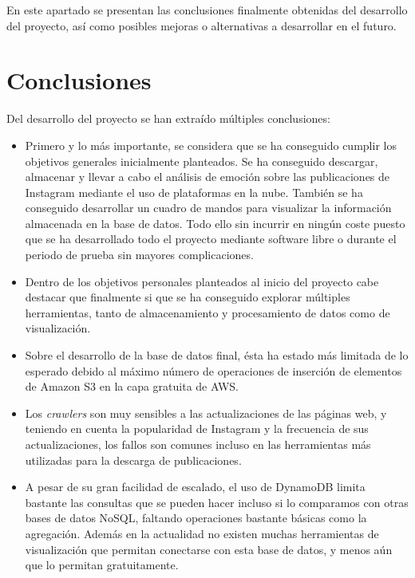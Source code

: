 
En este apartado se presentan las conclusiones finalmente obtenidas del desarrollo del proyecto, así como posibles mejoras o alternativas a desarrollar en el futuro.

\section{Conclusiones}

Del desarrollo del proyecto se han extraído múltiples conclusiones: 

\begin{itemize}
    \item Primero y lo más importante, se considera que se ha conseguido cumplir los objetivos generales inicialmente planteados. Se ha conseguido descargar, almacenar y llevar a cabo el análisis de emoción sobre las publicaciones de Instagram mediante el uso de plataformas en la nube. También se ha conseguido desarrollar un cuadro de mandos para visualizar la información almacenada en la base de datos. Todo ello sin incurrir en ningún coste puesto que se ha desarrollado todo el proyecto mediante software libre o durante el periodo de prueba sin mayores complicaciones.
    \item Dentro de los objetivos personales planteados al inicio del proyecto cabe destacar que finalmente si que se ha conseguido explorar múltiples herramientas, tanto de almacenamiento y procesamiento de datos como de visualización.
    \item Sobre el desarrollo de la base de datos final, ésta ha estado más limitada de lo esperado debido al máximo número de operaciones de inserción de elementos de Amazon S3 en la capa gratuita de AWS.
    \item Los \textit{crawlers} son muy sensibles a las actualizaciones de las páginas web, y teniendo en cuenta la popularidad de Instagram y la frecuencia de sus actualizaciones, los fallos son comunes incluso en las herramientas más utilizadas para la descarga de publicaciones.
    \item A pesar de su gran facilidad de escalado, el uso de DynamoDB limita bastante las consultas que se pueden hacer incluso si lo comparamos con otras bases de datos NoSQL, faltando operaciones bastante básicas como la agregación. Además en la actualidad no existen muchas herramientas de visualización que permitan conectarse con esta base de datos, y menos aún que lo permitan gratuitamente.
\end{itemize}

